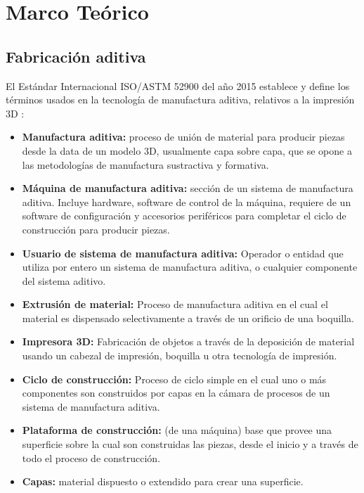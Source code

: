 

\chapter{Marco Te\'orico}
\label{cap:preliminares}



\section{Fabricaci\'on aditiva}

El Estándar Internacional ISO/ASTM 52900 del año 2015 establece y define los términos usados en la tecnología de manufactura aditiva, relativos a la impresión 3D \parencite{iso2015}:

\begin{itemize}
\item \textbf{Manufactura aditiva:} proceso de unión de material para producir piezas desde la data de un modelo 3D, usualmente capa sobre capa, que se opone a las metodologías de manufactura sustractiva y formativa.
\item \textbf{Máquina de manufactura aditiva:} sección de un sistema de manufactura aditiva. Incluye hardware, software de control de la máquina, requiere de un software de configuración y accesorios periféricos para completar el ciclo de construcción para producir piezas.
\item \textbf{Usuario de sistema de manufactura aditiva:} Operador o entidad que utiliza por entero un sistema de manufactura aditiva, o cualquier componente del sistema aditivo.
\item \textbf{Extrusión de material:} Proceso de manufactura aditiva en el cual el material es dispensado selectivamente a través de un orificio de una boquilla. 
\item \textbf{Impresora 3D:} Fabricación de objetos a través de la deposición de material usando un cabezal de impresión, boquilla u otra tecnología de impresión.
\item \textbf{Ciclo de construcción:}  Proceso de ciclo simple en el cual uno o más componentes son construidos por capas en la cámara de procesos de un sistema de manufactura aditiva.
\item \textbf{Plataforma de construcción:} (de una máquina) base que provee una superficie sobre la cual son construidas las piezas, desde el inicio y a través de todo el proceso de construcción.
\item \textbf{Capas: } material dispuesto o extendido para crear una superficie.

\end{itemize}
